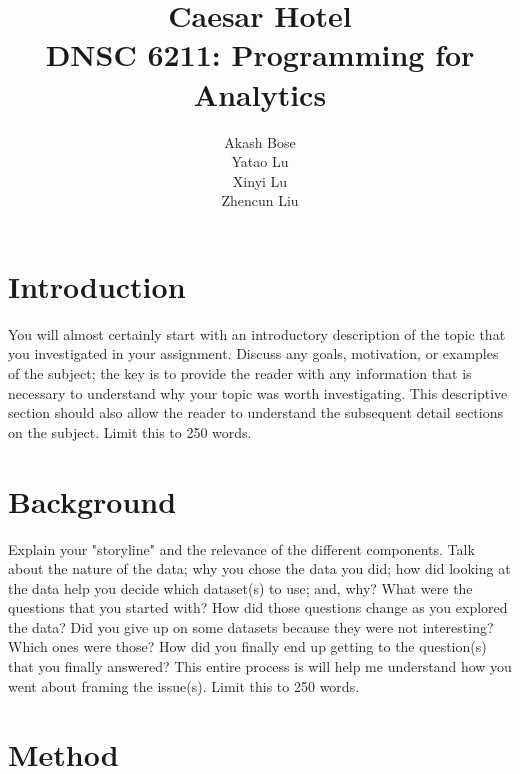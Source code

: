 \documentclass{article}
\title{Caesar Hotel  \\ \small{DNSC 6211: Programming for Analytics}}
\author{
    Akash Bose \\
	Yatao Lu \\
	Xinyi Lu \\
	Zhencun Liu \\
}
\date{}
\begin{document}
\maketitle


\pagebreak
\tableofcontents


\pagebreak

%
%
\section{Introduction}
\label{introduction}

You will almost certainly start with an introductory description of the topic that you investigated in your assignment.  Discuss any goals, motivation, or examples of the subject; the key is to provide the reader with any information that is necessary to understand why your topic was worth investigating.  This descriptive section should also allow the reader to understand the subsequent detail sections on the subject. Limit this to 250 words.

\section{Background}

Explain your "storyline" and the relevance of the different components. Talk about the nature of the data; why you chose the data you did; how did looking at the data help you decide which dataset(s) to use; and, why? What were the questions that you started with? How did those questions change as you explored the data? Did you give up on some datasets because they were not interesting? Which ones were those? How did you finally end up getting to the question(s) that you finally answered? This entire process is will help me understand how you went about framing the issue(s). Limit this to 250 words.

\section{Method}
\end{document}

